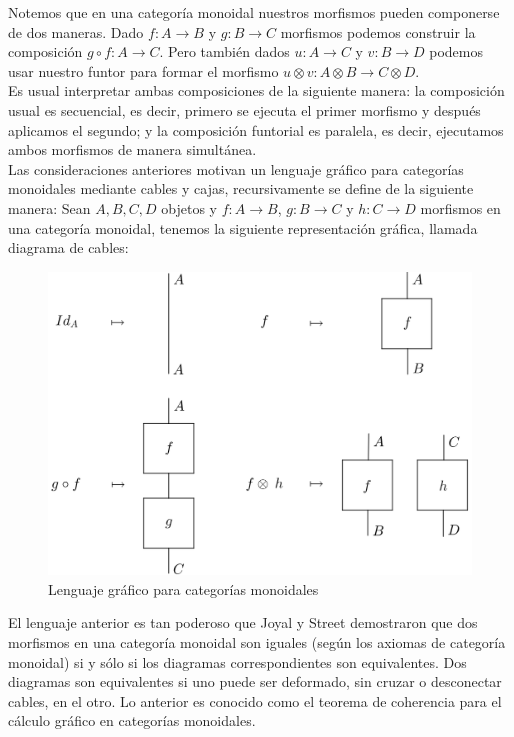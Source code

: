 \documentclass[../main.tex]{subfiles}
\begin{document}
Notemos que en una categoría monoidal nuestros morfismos pueden componerse de dos maneras. Dado $f:A \to B$ y $g: B \to C$ morfismos podemos construir la composición $g \circ f: A \to C$. Pero también dados $u: A \to C$ y $v: B \to D$ podemos usar nuestro funtor para formar el morfismo $u \otimes v : A \otimes B \to C \otimes D$. \\

Es usual interpretar ambas composiciones de la siguiente manera: la composición usual es secuencial, es decir, primero se ejecuta el primer morfismo y después aplicamos el segundo; y la composición funtorial es paralela, es decir, ejecutamos ambos morfismos de manera simultánea. \\

Las consideraciones anteriores motivan un lenguaje gráfico para categorías monoidales mediante cables y cajas, recursivamente se define de la siguiente manera: Sean $A,B,C,D$ objetos y $f:A \to B$, $g:B \to C$ y $h:C \to D$ morfismos en una categoría monoidal, tenemos la siguiente representación gráfica, llamada diagrama de cables:
\begin{figure}[H]
	\includegraphics[scale=2.9]{diagrama/lenguaje.png}
	\centering
	\caption{Lenguaje gráfico para categorías monoidales}
	\label{lenguaje}
\end{figure}

El lenguaje anterior es tan poderoso que Joyal y Street demostraron que dos morfismos en una categoría monoidal son iguales (según los axiomas de categoría monoidal) si y sólo si los diagramas correspondientes son equivalentes. Dos diagramas son equivalentes si uno puede ser deformado, sin cruzar o desconectar cables, en el otro. Lo anterior es conocido como el teorema de coherencia para el cálculo gráfico en categorías monoidales. 
\end{document}
